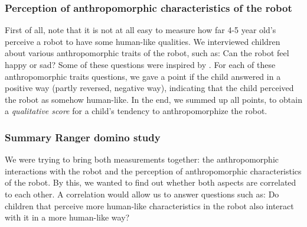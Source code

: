 \documentclass{frontiersSCNS} %
\begin{document}
%


\subsubsection{Perception of anthropomorphic characteristics of the robot\\}

First of all, note that it is not at all easy to measure how far 4-5 year old's 
perceive a robot to have some human-like qualities. We interviewed children about 
various anthropomorphic traits of the robot, such as: Can the robot feel happy or 
sad? Some of these questions were inspired by \cite{kahn_jr._robotic_2006}. For 
each of these anthropomorphic traits questions, we gave a point if the child 
answered in a positive way (partly reversed, negative way), indicating that the 
child perceived the robot as somehow human-like. In the end, we summed up all 
points, to obtain a \textit{qualitative score} for a child's tendency to 
anthropomorphize the robot.


\subsubsection{Summary Ranger domino study\\}

We were trying to bring both measurements together: the anthropomorphic 
interactions with the robot and the perception of anthropomorphic characteristics 
of the robot. By this, we wanted to find out whether both aspects are correlated to 
each other. A correlation would allow us to answer questions such as: Do children 
that perceive more human-like characteristics in the robot also interact with it in 
a more human-like way?
\end{document}
